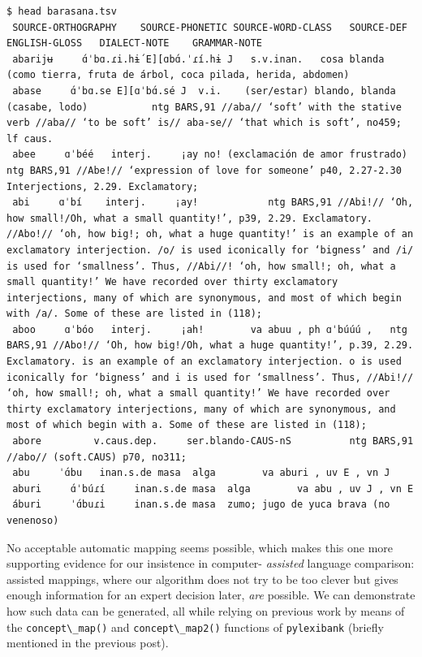 \documentclass[
  a4paper,
  14pt,
  oneside,
  tablecaptionabove
]{scrbook}
\newcommand{\passthrough}[1]{#1}
\begin{document}
\begin{lstlisting}
$ head barasana.tsv
 SOURCE-ORTHOGRAPHY    SOURCE-PHONETIC SOURCE-WORD-CLASS   SOURCE-DEF  ENGLISH-GLOSS   DIALECT-NOTE    GRAMMAR-NOTE
 abarijʉ     ɑ́ˈbɑ.ɾi.hɨ́ E][ɑbɑ́.ˈɾí.hɨ J   s.v.inan.   cosa blanda (como tierra, fruta de árbol, coca pilada, herida, abdomen)
 abase     ɑ́ˈbɑ.se E][ɑˈbɑ́.sé J  v.i.    (ser/estar) blando, blanda (casabe, lodo)           ntg BARS,91 //aba// ‘soft’ with the stative verb //aba// ‘to be soft’ is// aba-se// ‘that which is soft’, no459; lf caus.
 abee     ɑˈbéé   interj.     ¡ay no! (exclamación de amor frustrado)             ntg BARS,91 //Abe!// ‘expression of love for someone’ p40, 2.27-2.30 Interjections, 2.29. Exclamatory;
 abi     ɑˈbí    interj.     ¡ay!            ntg BARS,91 //Abi!// ‘Oh, how small!/Oh, what a small quantity!’, p39, 2.29. Exclamatory. //Abo!// ‘oh, how big!; oh, what a huge quantity!’ is an example of an exclamatory interjection. /o/ is used iconically for ‘bigness’ and /i/ is used for ‘smallness’. Thus, //Abi//! ‘oh, how small!; oh, what a small quantity!’ We have recorded over thirty exclamatory interjections, many of which are synonymous, and most of which begin with /a/. Some of these are listed in (118);
 aboo     ɑˈbóo   interj.     ¡ah!        va abuu , ph ɑˈbúúú ,   ntg BARS,91 //Abo!// ‘Oh, how big!/Oh, what a huge quantity!’, p.39, 2.29. Exclamatory. is an example of an exclamatory interjection. o is used iconically for ‘bigness’ and i is used for ‘smallness’. Thus, //Abi!// ‘oh, how small!; oh, what a small quantity!’ We have recorded over thirty exclamatory interjections, many of which are synonymous, and most of which begin with a. Some of these are listed in (118);
 abore         v.caus.dep.     ser.blando-CAUS-nS          ntg BARS,91 //abo// (soft.CAUS) p70, no311;
 abu     ˈɑ́bu   inan.s.de masa  alga        va aburi , uv E , vn J
 aburi     ɑ́ˈbúɾí     inan.s.de masa  alga        va abu , uv J , vn E
 áburi     ˈɑ́buɾi     inan.s.de masa  zumo; jugo de yuca brava (no venenoso)
\end{lstlisting}

No acceptable automatic mapping seems possible, which makes this one
more supporting evidence for our insistence in computer- \emph{assisted}
language comparison: assisted mappings, where our algorithm does not try
to be too clever but gives enough information for an expert decision
later, \emph{are} possible. We can demonstrate how such data can be
generated, all while relying on previous work by means of the
\passthrough{\lstinline!concept\_map()!} and
\passthrough{\lstinline!concept\_map2()!} functions of
\passthrough{\lstinline!pylexibank!} (briefly mentioned in the previous
post).
\end{document}

